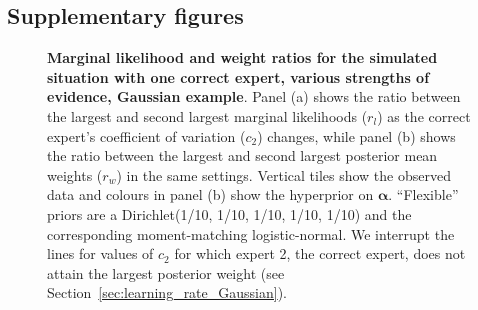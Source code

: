 \documentclass[12pt]{article}
\begin{document}
\subsection{Supplementary figures}

\begin{figure}[!ht]
\begin{center}
\end{center}
\caption{\textbf{Marginal likelihood and weight ratios for the simulated situation with one correct expert, various strengths of evidence, Gaussian example}.
Panel (a) shows the ratio between the largest and second largest marginal likelihoods ($r_l$) as the correct expert's coefficient of variation ($c_2$) changes, while panel (b) shows the ratio between the largest and second largest posterior mean weights ($r_w$) in the same settings.
Vertical tiles show the observed data and colours in panel (b) show the hyperprior on $\boldsymbol\alpha$.
``Flexible'' priors are a Dirichlet(1/10, 1/10, 1/10, 1/10, 1/10) and the corresponding moment-matching logistic-normal.
We interrupt the lines for values of $c_2$ for which expert 2, the correct expert, does not attain the largest posterior weight (see Section~\ref{sec:learning_rate_Gaussian}). 
}
\label{fig:one_correct_results_normal}
\end{figure}
\end{document}
